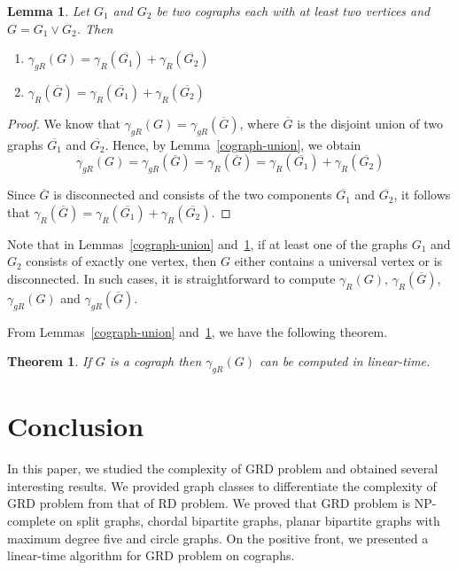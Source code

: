 \documentclass[preprint,12pt]{elsarticle}
\newtheorem{theorem}{Theorem}[section]
\newtheorem{lemma}{Lemma}
\begin{document}
\begin{lemma}\label{cograph-join}
    Let $G_1$ and $G_2$ be two cographs each with at least two vertices and  $G = G_1 \vee G_2$. Then 
    \begin{enumerate}
        \item $\gamma_{gR}(G)=\gamma_{R}(\overline{G_1} )+\gamma_{R}(\overline{G_2})$
        \item $\gamma_{R}(\overline G)=\gamma_{R}(\overline{G_1} )+\gamma_{R}(\overline{G_2})$
    \end{enumerate}
\end{lemma}
\begin{proof}
    We know that $\gamma_{gR}(G)=\gamma_{gR}(\overline G)$, where $\overline G$ is the disjoint union of two graphs $\overline{G_1}$ and $\overline{G_2}$. Hence, by  Lemma~\ref{cograph-union}, we obtain $$\gamma_{gR}(G)=\gamma_{gR}(\overline G)=\gamma_{R}(\overline{G})=\gamma_{R}(\overline{G_1} )+\gamma_{R}(\overline{G_2})$$

    Since $\overline{G}$ is disconnected and consists of the two components $\overline{G_1}$ and $\overline{G_2}$, it follows that $\gamma_{R}(\overline G)=\gamma_{R}(\overline{G_1} )+\gamma_{R}(\overline{G_2})$. 
\end{proof}
Note that in Lemmas~\ref{cograph-union} and~\ref{cograph-join}, if at least one of the graphs $G_1$ and $G_2$ consists of exactly one vertex, then $G$ either contains a universal vertex or is disconnected. In such cases, it is straightforward to compute $\gamma_{R}(G)$, $\gamma_{R}(\overline{G})$, $\gamma_{gR}(G)$ and $\gamma_{gR}(\overline{G})$.

From Lemmas~\ref{cograph-union} and~\ref{cograph-join}, we have the following theorem.
\begin{theorem}
If $G$ is a cograph then $\gamma_{gR}(G)$ can be computed in linear-time.
\end{theorem}
\section{Conclusion}
In this paper, we studied the complexity of GRD problem and obtained several interesting results. We provided graph classes to differentiate the complexity of GRD problem from that of RD problem. We proved that GRD problem is NP-complete on split graphs, chordal bipartite graphs, planar bipartite graphs with maximum degree five and circle graphs. On the positive front, we presented a linear-time algorithm for GRD problem on cographs. 
\medskip
\end{document}
